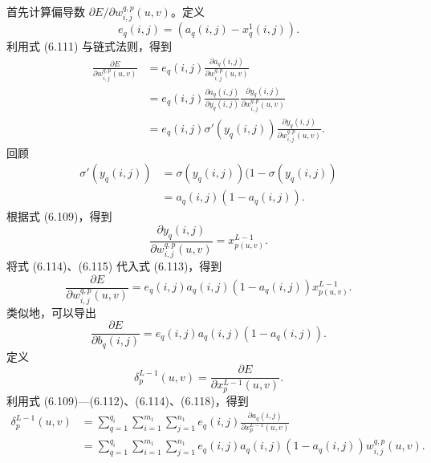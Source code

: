 首先计算偏导数 $\partial E/\partial w_{i,j}^{q,p}(u,v)$。定义
\begin{equation}
e_q(i,j)=(a_q(i,j)-x_q^1(i,j)).
\tag{6.112}
\end{equation}
利用式 (6.111) 与链式法则，得到
\begin{equation}
\begin{aligned}
\frac{\partial E}{\partial w_{i,j}^{q,p}(u,v)}&=e_q(i,j)\frac{\partial a_q(i,j)}{\partial w_{i,j}^{q,p}(u,v)}\\
&=e_q(i,j)\frac{\partial a_q(i,j)}{\partial y_q(i,j)}\frac{\partial y_q(i,j)}{\partial w_{i,j}^{q,p}(u,v)}\\
&=e_q(i,j)\sigma'(y_q(i,j))\frac{\partial y_q(i,j)}{\partial w_{i,j}^{q,p}(u,v)}.
\end{aligned}\tag{6.113}
\end{equation}
回顾
\begin{equation}
\begin{aligned}
\sigma'(y_q(i,j))&=\sigma(y_q(i,j))\bigl(1-\sigma(y_q(i,j))\\
&=a_q(i,j)(1-a_q(i,j)).
\end{aligned}\tag{6.114}
\end{equation}
根据式 (6.109)，得到
\begin{equation}
\frac{\partial y_q(i,j)}{\partial w_{i,j}^{q,p}(u,v)}=x_{p(u,v)}^{L-1}.
\tag{6.115}
\end{equation}
将式 (6.114)、(6.115) 代入式 (6.113)，得到
\begin{equation}
\frac{\partial E}{\partial w_{i,j}^{q,p}(u,v)}=e_q(i,j)a_q(i,j)(1-a_q(i,j))x_{p(u,v)}^{L-1}.
\tag{6.116}
\end{equation}
类似地，可以导出
\begin{equation}
\frac{\partial E}{\partial b_q(i,j)}=e_q(i,j)a_q(i,j)(1-a_q(i,j)).
\tag{6.117}
\end{equation}
定义
\begin{equation}
\delta_p^{L-1}(u,v)=\frac{\partial E}{\partial x_p^{L-1}(u,v)}.
\tag{6.118}
\end{equation}
利用式 (6.109)—(6.112)、(6.114)、(6.118)，得到
\begin{equation}
\begin{aligned}
\delta_p^{L-1}(u,v)&=\sum_{q=1}^{q_i}\sum_{i=1}^{m_1}\sum_{j=1}^{n_1}e_q(i,j)\frac{\partial a_q(i,j)}{\partial x_p^{L-1}(u,v)}\\
&=\sum_{q=1}^{q_i}\sum_{i=1}^{m_1}\sum_{j=1}^{n_1}e_q(i,j)a_q(i,j)(1-a_q(i,j))w_{i,j}^{q,p}(u,v).
\end{aligned}\tag{6.119}
\end{equation}

